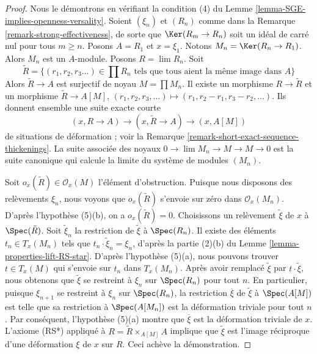 \begin{proof}
Nous le démontrons en vérifiant la condition (4) du
Lemme \ref{lemma-SGE-implies-openness-versality}.
Soient $(\xi_n)$ et $(R_n)$ comme dans la Remarque \ref{remark-strong-effectiveness},
de sorte que $\Ker(R_m \to R_n)$ soit un idéal de carré nul
pour tous $m \geq n$. Posons $A = R_1$ et $x = \xi_1$.
Notons $M_n = \Ker(R_n \to R_1)$.
Alors $M_n$ est un $A$-module. Posons $R = \lim R_n$.
Soit
$$
\tilde R = \{(r_1, r_2, r_3 \ldots) \in \prod R_n
\text{ tels que tous aient la même image dans }A\}
$$
Alors $\tilde R \to A$ est surjectif de noyau $M = \prod M_n$.
Il existe un morphisme $R \to \tilde R$ et un morphisme
$\tilde R \to A[M]$, $(r_1, r_2, r_3, \ldots) \mapsto
(r_1, r_2 - r_1, r_3 - r_2, \ldots)$.
Ils donnent ensemble une suite exacte courte
$$
(x, R \to A) \to (x, \tilde R \to A) \to (x, A[M])
$$
de situations de déformation ; voir la
Remarque \ref{remark-short-exact-sequence-thickenings}.
La suite associée des noyaux
$0 \to \lim M_n \to M \to M \to 0$
est la suite canonique qui calcule la limite
du système de modules $(M_n)$.

\medskip\noindent
Soit $o_x(\tilde R) \in \mathcal{O}_x(M)$ l'élément d'obstruction.
Puisque nous disposons des relèvements $\xi_n$, nous voyons que $o_x(\tilde R)$
s'envoie sur zéro dans $\mathcal{O}_x(M_n)$. D'après l'hypothèse (5)(b),
on a $o_x(\tilde R) = 0$. Choisissons un relèvement $\tilde \xi$
de $x$ à $\Spec(\tilde R)$. Soit $\tilde \xi_n$ la
restriction de $\tilde \xi$ à $\Spec(R_n)$. Il existe
des éléments $t_n \in T_x(M_n)$ tels que
$t_n \cdot \tilde \xi_n = \xi_n$, d'après la partie (2)(b) du
Lemme \ref{lemma-properties-lift-RS-star}.
D'après l'hypothèse (5)(a), nous pouvons trouver $t \in T_x(M)$
qui s'envoie sur $t_n$ dans $T_x(M_n)$. Après avoir remplacé
$\tilde \xi$ par $t \cdot \tilde \xi$, nous obtenons que
$\tilde \xi$ se restreint à $\xi_n$ sur $\Spec(R_n)$ pour tout $n$.
En particulier, puisque $\xi_{n + 1}$ se restreint à $\xi_n$
sur $\Spec(R_n)$, la restriction $\overline{\xi}$ de $\tilde \xi$
à $\Spec(A[M])$ est telle que sa restriction à
$\Spec(A[M_n])$ est la déformation triviale pour tout $n$.
Par conséquent, l'hypothèse (5)(a) montre que $\overline{\xi}$
est la déformation triviale de $x$. L'axiome (RS*)
appliqué à $R = \tilde R \times_{A[M]} A$
implique que $\tilde \xi$ est l'image réciproque
d'une déformation $\xi$ de $x$ sur $R$. Ceci achève la démonstration.
\end{proof}

